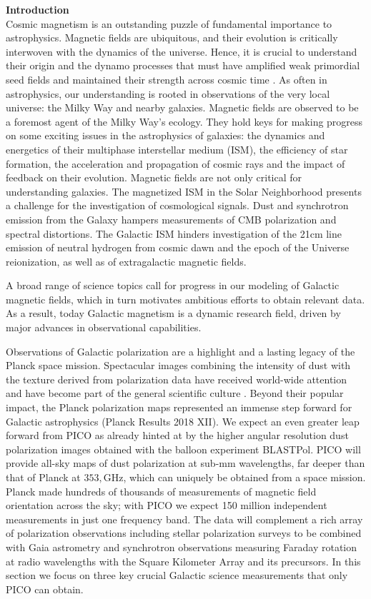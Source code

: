 \documentclass[PICOReport.tex]{subfiles}
\begin{document}
{\bf Introduction}\\
Cosmic magnetism is an outstanding puzzle of fundamental importance to astrophysics. Magnetic fields are ubiquitous, and their evolution is critically interwoven with the dynamics of the universe. Hence, it is crucial to understand
their origin and the dynamo processes that must have amplified weak  primordial seed fields 
and maintained their strength across cosmic time \citep{Brandenburg2005}. 
As often in astrophysics, our understanding is rooted in 
observations of the very local universe: the Milky Way and nearby galaxies. Magnetic fields are observed to be a foremost agent of the 
Milky Way's ecology. They hold keys for making progress on some exciting issues in the astrophysics of galaxies: the dynamics and 
energetics of their multiphase interstellar medium (ISM), the efficiency of star formation, the acceleration and propagation of cosmic rays and the 
impact of feedback on their evolution. Magnetic fields are not only critical for understanding galaxies. 
The magnetized ISM in the Solar Neighborhood presents a challenge for the investigation of cosmological signals. 
Dust and synchrotron emission from the Galaxy hampers measurements of CMB polarization and spectral distortions. The Galactic ISM
hinders investigation of the 21cm line emission of neutral hydrogen from cosmic dawn and the epoch of the Universe reionization, as well as of 
extragalactic magnetic fields.  

A broad range of science topics call for progress in our modeling of Galactic magnetic fields, which in turn 
motivates ambitious efforts to obtain relevant data. 
As a result, today Galactic magnetism is a dynamic research field, driven by major advances in observational capabilities.

Observations of Galactic polarization are a highlight and a lasting legacy of the Planck space mission. 
Spectacular images combining the intensity of dust with the texture derived from polarization data 
have received world-wide attention and have become part of the general scientific culture \citep{PlanckI2015}. 
Beyond their popular impact, the Planck polarization maps represented an 
immense step forward for Galactic astrophysics (Planck Results 2018 XII). 
We expect an even greater leap forward from PICO as 
already hinted at by the higher angular resolution dust polarization images obtained with the balloon experiment BLASTPol.  
PICO will provide all-sky maps of dust polarization at sub-mm wavelengths, far deeper than that 
of Planck at $353,$GHz, which can uniquely be obtained from a space mission. Planck made hundreds of thousands of measurements of magnetic field orientation across the sky; with PICO we expect 150 million independent measurements in just one frequency band.
The data will complement a rich array of polarization observations including stellar polarization surveys to be 
combined with Gaia astrometry and synchrotron observations measuring Faraday rotation at radio wavelengths 
with the Square Kilometer Array and its precursors. 
In this section we focus on three key crucial Galactic science measurements that only PICO can obtain.
\end{document}
